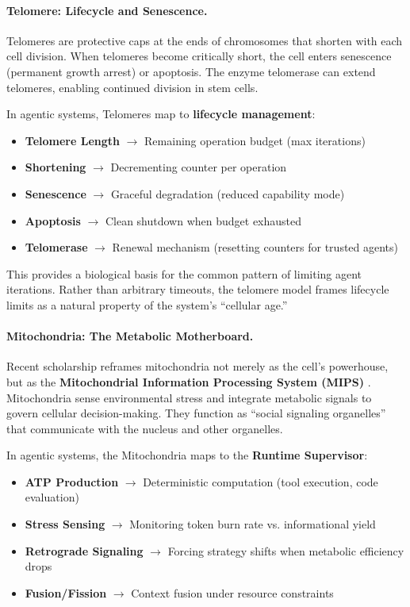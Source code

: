 \paragraph{Telomere: Lifecycle and Senescence.}
Telomeres are protective caps at the ends of chromosomes that shorten with each cell division. When telomeres become critically short, the cell enters senescence (permanent growth arrest) or apoptosis. The enzyme telomerase can extend telomeres, enabling continued division in stem cells.

In agentic systems, Telomeres map to \textbf{lifecycle management}:
\begin{itemize}[leftmargin=*]
\item \textbf{Telomere Length} $\to$ Remaining operation budget (max iterations)
\item \textbf{Shortening} $\to$ Decrementing counter per operation
\item \textbf{Senescence} $\to$ Graceful degradation (reduced capability mode)
\item \textbf{Apoptosis} $\to$ Clean shutdown when budget exhausted
\item \textbf{Telomerase} $\to$ Renewal mechanism (resetting counters for trusted agents)
\end{itemize}
This provides a biological basis for the common pattern of limiting agent iterations. Rather than arbitrary timeouts, the telomere model frames lifecycle limits as a natural property of the system's ``cellular age.''

\paragraph{Mitochondria: The Metabolic Motherboard.}
Recent scholarship reframes mitochondria not merely as the cell's powerhouse, but as the \textbf{Mitochondrial Information Processing System (MIPS)} \cite{picard2022mips}. Mitochondria sense environmental stress and integrate metabolic signals to govern cellular decision-making. They function as ``social signaling organelles'' that communicate with the nucleus and other organelles.

In agentic systems, the Mitochondria maps to the \textbf{Runtime Supervisor}:
\begin{itemize}[leftmargin=*]
\item \textbf{ATP Production} $\to$ Deterministic computation (tool execution, code evaluation)
\item \textbf{Stress Sensing} $\to$ Monitoring token burn rate vs. informational yield
\item \textbf{Retrograde Signaling} $\to$ Forcing strategy shifts when metabolic efficiency drops
\item \textbf{Fusion/Fission} $\to$ Context fusion under resource constraints
\end{itemize}

